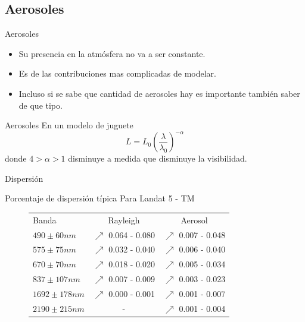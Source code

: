 \documentclass[handout]{beamer}
\begin{document}
\subsection{Aerosoles}

\begin{frame}{Aerosoles}
  \begin{itemize}
    \item Su presencia en la atmósfera no va a ser constante.
    \item Es de las contribuciones mas complicadas de modelar.
    \item Incluso si se sabe que cantidad de aerosoles hay es importante también saber de que tipo.
  \end{itemize}
\end{frame}

\begin{frame}{Aerosoles}
  En un modelo de juguete
  \begin{equation}
    L = L_0 \left( \frac{\lambda}{\lambda_0} \right)^{-\alpha}
  \end{equation}
  donde $4 > \alpha > 1$ disminuye a medida que disminuye la visibilidad.
\end{frame}

\begin{frame}{Dispersión}
  \begin{exampleblock}{Porcentaje de dispersión típica}
    Para Landat 5 - TM
    \begin{figure}
      \begin{tabular}{l c c}
        Banda & Rayleigh  & Aerosol    \\
        $490\pm60 nm$& $\nearrow$ 0.064 - 0.080   & $\nearrow$ 0.007 - 0.048 \\
        $575\pm75 nm$& $\nearrow$ 0.032 - 0.040   & $\nearrow$ 0.006 - 0.040  \\
        $670\pm70 nm$& $\nearrow$ 0.018 - 0.020   & $\nearrow$ 0.005 - 0.034 \\
        $837\pm107 nm$& $\nearrow$ 0.007 - 0.009  & $\nearrow$ 0.003 - 0.023 \\
        $1692\pm178 nm$& $\nearrow$ 0.000 - 0.001  & $\nearrow$ 0.001 - 0.007 \\
        $2190\pm215 nm$& -                         & $\nearrow$ 0.001 - 0.004 \\
      \end{tabular}
    \end{figure}
  \end{exampleblock}
\end{frame}
\end{document}
